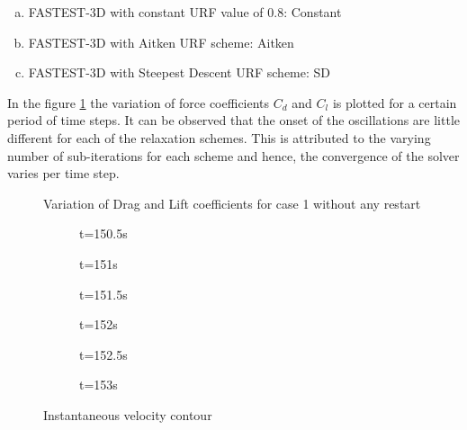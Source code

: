 \begin{enumerate}[(a)]
\item FASTEST-3D with constant URF value of 0.8: Constant
\item FASTEST-3D with Aitken URF scheme: Aitken
\item FASTEST-3D with Steepest Descent URF scheme: SD
\end{enumerate} 

In the figure \ref{fig:4.5} the variation of force coefficients $C_d$ and $C_l$ is plotted for a certain period of time steps. It can be observed that the onset of the oscillations are little different for each of the relaxation schemes. This is attributed to the varying number of sub-iterations for each scheme and hence, the convergence of the solver varies per time step. 

\begin{figure}[H]
\centering
{}
\caption{Variation of Drag and Lift coefficients for case 1 without any restart}
\label{fig:4.5}
\end{figure}


\begin{figure}[H]
\centering
	\begin{subfigure}[t]{7cm}
		\caption{t=150.5s}
	\end{subfigure}
	\begin{subfigure}[t]{7cm}
		\caption{t=151s}
	\end{subfigure}
	
	\begin{subfigure}[t]{7cm}
		\caption{t=151.5s}
	\end{subfigure}
	\begin{subfigure}[t]{7cm}
		\caption{t=152s}
	\end{subfigure}
	
	\begin{subfigure}[t]{7cm}
		\caption{t=152.5s}
	\end{subfigure}
	\begin{subfigure}[t]{7cm}
		\caption{t=153s}
	\end{subfigure}
\caption{Instantaneous velocity contour}
\label{fig:4.6}
\end{figure}

